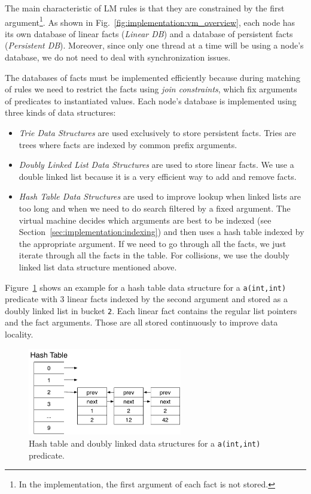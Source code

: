 The main characteristic of LM rules is that they are constrained by the first
argument\footnote{In the implementation, the first argument of each fact is not
   stored.}. As shown in Fig.~\ref{fig:implementation:vm_overview}, each node
has its own database of linear facts (\emph{Linear DB}) and a database of
persistent facts (\emph{Persistent DB}).  Moreover, since only one thread at a
time will be using a node's database, we do not need to deal with
synchronization issues.

The databases of facts must be implemented efficiently because during matching
of rules we need to restrict the facts using \emph{join constraints}, which fix
arguments of predicates to instantiated values. Each node's database is
implemented using three kinds of data structures:

\begin{itemize}

\item \emph{Trie Data Structures} are used exclusively to store persistent
   facts. Tries are trees where facts are indexed by common prefix arguments.

\item \emph{Doubly Linked List Data Structures} are used to store linear facts.
   We use a double linked list because it is a very efficient way to add and
   remove facts.

\item \emph{Hash Table Data Structures} are used to improve lookup when linked
   lists are too long and when we need to do search filtered by a fixed
   argument. The virtual machine decides which arguments are best to be indexed
   (see Section~\ref{sec:implementation:indexing}) and then uses a hash table
   indexed by the appropriate argument. If we need to go through all the facts,
   we just iterate through all the facts in the table. For collisions, we use
   the doubly linked list data structure mentioned above.

\end{itemize}

Figure~\ref{fig:implementation:hash_table} shows an example for a hash table
data structure for a \texttt{a(int,int)} predicate with 3 linear facts indexed
by the second argument and stored as a doubly linked list in bucket \texttt{2}.
Each linear fact contains the regular list pointers and the fact arguments.
Those are all stored continuously to improve data locality.

\begin{figure}[ht]
\centering
\includegraphics[width=0.6\textwidth]{figures/implementation/hash_table.pdf}
\caption{Hash table and doubly linked data structures for 
   a \texttt{a(int,int)} predicate.}
\label{fig:implementation:hash_table}
\end{figure}

